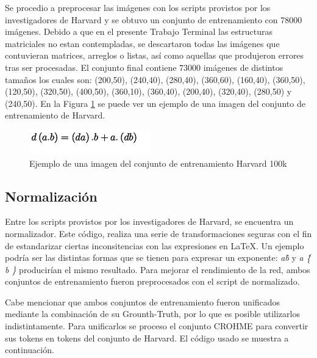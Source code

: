 Se procedio a preprocesar las imágenes con los scripts provistos por los investigadores de Harvard y se obtuvo un conjunto de entrenamiento con 78000 imágenes. Debido a que en el presente Trabajo Terminal las estructuras matriciales no estan contempladas, se descartaron todas las imágenes que contuvieran matrices, arreglos o listas, así como aquellas que produjeron errores tras ser procesadas. El conjunto final contiene 73000 imágenes de distintos tamaños los cuales son: (200,50), (240,40), (280,40), (360,60), (160,40), (360,50), (120,50), (320,50), (400,50), (360,10), (360,40), (200,40), (320,40), (280,50) y (240,50). En la Figura \ref{fig:harvard-example} se puede ver un ejemplo de una imagen del conjunto de entrenamiento de Harvard.

\begin{figure}[H]
	\centering
	\includegraphics{capitulo5/dataset/harvard}
	\caption{Ejemplo de una imagen del conjunto de entrenamiento Harvard 100k}
	\label{fig:harvard-example}
\end{figure}

\subsection{Normalización}

Entre los scripts provistos por los investigadores de Harvard, se encuentra un normalizador. Este código, realiza una serie de transformaciones seguras con el fin de estandarizar ciertas inconsitencias con las expresiones en \LaTeX{}. Un ejemplo podría ser las distintas formas que se tienen para expresar un exponente: \textit{a\^b} y \textit{a \^ \{ b \}} producirían el mismo resultado. Para mejorar el rendimiento de la red, ambos conjuntos de entrenamiento fueron preprocesados con el script de normalizado.

Cabe mencionar que ambos conjuntos de entrenamiento fueron unificados mediante la combinación de su Grounth-Truth, por lo que es posible utilizarlos indistintamente. Para unificarlos se proceso el conjunto CROHME para convertir sus tokens en tokens del conjunto de Harvard. El código usado se muestra a continuación.



\newpage



